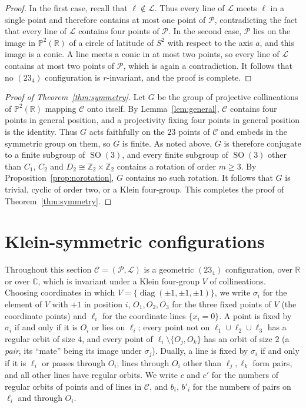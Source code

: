 \documentclass[11pt]{article}
\theoremstyle{plain}
\theoremstyle{definition}
\newcommand{\RR}{\mathbb{R}}
\newcommand{\CC}{\mathbb{C}}
\newcommand{\ZZ}{\mathbb{Z}}
\newcommand{\PP}{\mathbb{P}}
\newcommand{\cP}{\mathcal{P}}
\newcommand{\cL}{\mathcal{L}}
\newcommand{\cC}{\mathcal{C}}
\newcommand{\SO}{\operatorname{SO}}
\begin{document}
\begin{proof}
In the first case, recall that $\ell\notin\cL$.  Thus every line of $\cL$ meets $\ell$ in a single point and therefore contains at most one point of $\cP$, contradicting the fact that every line of $\cL$ contains four points of $\cP$.  In the second case, $\cP$ lies on the image in $\PP^2(\RR)$ of a circle of latitude of $S^2$ with respect to the axis $a$, and this image is a conic.  A line meets a conic in at most two points, so every line of $\cL$ contains at most two points of $\cP$, which is again a contradiction.  It follows that no $(23_4)$ configuration is $r$-invariant, and the proof is complete.
\end{proof}

\begin{proof}[Proof of Theorem~\ref{thm:symmetry}]
Let $G$ be the group of projective collineations of $\PP^2(\RR)$ mapping $\cC$ onto itself.  By Lemma~\ref{lem:general}, $\cC$ contains four points in general position, and a projectivity fixing four points in general position is the identity.  Thus $G$ acts faithfully on the $23$ points of $\cC$ and embeds in the symmetric group on them, so $G$ is finite.  As noted above, $G$ is therefore conjugate to a finite subgroup of $\SO(3)$, and every finite subgroup of $\SO(3)$ other than $C_1$, $C_2$ and $D_2\cong\ZZ_2\times\ZZ_2$ contains a rotation of order $m\ge3$.  By Proposition~\ref{prop:norotation}, $G$ contains no such rotation.  It follows that $G$ is trivial, cyclic of order two, or a Klein four-group.  This completes the proof of Theorem~\ref{thm:symmetry}.
\end{proof}

\section{Klein-symmetric configurations}\label{sec:classification}

Throughout this section $\cC=(\cP,\cL)$ is a geometric $(23_4)$ configuration, over $\RR$ or over $\CC$, which is invariant under a Klein four-group $V$ of collineations.  Choosing coordinates in which $V=\{\operatorname{diag}(\pm1,\pm1,\pm1)\}$, we write $\sigma_i$ for the element of $V$ with $+1$ in position $i$, $O_1,O_2,O_3$ for the three fixed points of $V$ (the coordinate points) and $\ell_i$ for the coordinate lines $\{x_i=0\}$.  A point is fixed by $\sigma_i$ if and only if it is $O_i$ or lies on $\ell_i$; every point not on $\ell_1\cup\ell_2\cup\ell_3$ has a regular orbit of size $4$, and every point of $\ell_i\setminus\{O_j,O_k\}$ has an orbit of size $2$ (a \emph{pair}, its ``mate'' being its image under $\sigma_j$).  Dually, a line is fixed by $\sigma_i$ if and only if it is $\ell_i$ or passes through $O_i$; lines through $O_i$ other than $\ell_j,\ell_k$ form pairs, and all other lines have regular orbits.  We write $c$ and $c'$ for the numbers of regular orbits of points and of lines in $\cC$, and $b_i$, $b'_i$ for the numbers of pairs on $\ell_i$ and through $O_i$.
\end{document}
